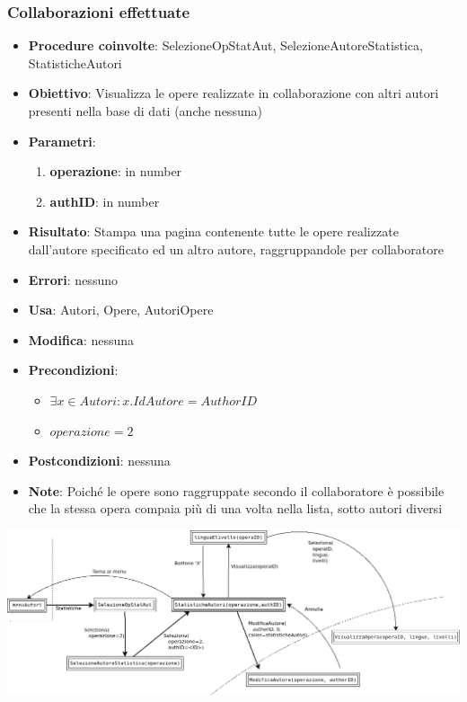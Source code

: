 \subsubsection{Collaborazioni effettuate}
\label{Collaborazioni}
\begin{itemize}
	\item \textbf{Procedure coinvolte}: SelezioneOpStatAut, SelezioneAutoreStatistica, StatisticheAutori
	\item \textbf{Obiettivo}: Visualizza le opere realizzate in collaborazione con altri autori presenti nella base di dati (anche nessuna)
	\item \textbf{Parametri}:
	\begin{enumerate}
		\item \textbf{operazione}: in number
		\item \textbf{authID}: in number
	\end{enumerate}
	\item \textbf{Risultato}: Stampa una pagina contenente tutte le opere realizzate dall'autore specificato ed un altro autore, raggruppandole per collaboratore
	\item \textbf{Errori}: nessuno
	\item \textbf{Usa}: Autori, Opere, AutoriOpere
	\item \textbf{Modifica}: nessuna
	\item \textbf{Precondizioni}:
	\begin{itemize}
		\item $\exists x \in Autori : x.IdAutore = AuthorID$
		\item $operazione  = 2$
	\end{itemize}
	\item \textbf{Postcondizioni}: nessuna
	\item \textbf{Note}: Poiché le opere sono raggruppate secondo il collaboratore
	è possibile che la stessa opera compaia più di una volta nella lista, sotto autori
	diversi
\end{itemize}
\includegraphics[width=\textwidth]{img/statAutori-2.png}\\[1cm]

